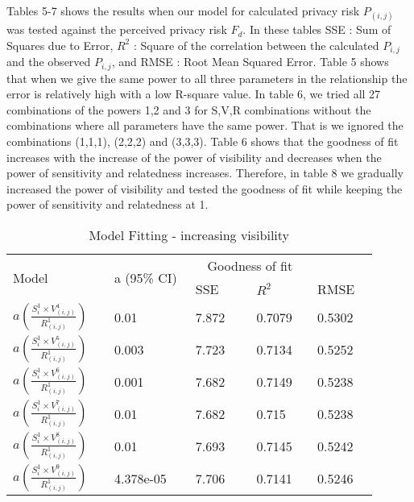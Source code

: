 \documentclass[10pt]{article}
\begin{document}
Tables 5-7 shows the results when our model for calculated privacy risk $P_{(i,j)}$ was tested against the perceived privacy risk $F_d$. In these tables SSE : Sum of Squares due to Error, $R^2$ : Square of the correlation between the calculated $P_{i,j}$ and the observed $P_{i,j}$, and RMSE : Root Mean Squared Error. Table 5 shows that when we give the same power to all three parameters in the relationship the error is relatively high with a low R-square value. In table 6, we tried all 27 combinations of the powers 1,2 and 3 for S,V,R combinations without the combinations where all parameters have the same power. That is we ignored the combinations (1,1,1), (2,2,2) and (3,3,3). Table 6 shows that the goodness of fit increases with the increase of the power of visibility and decreases when the power of sensitivity and relatedness increases. Therefore, in table 8 we gradually increased the power of visibility and tested the goodness of fit while keeping the power of sensitivity and relatedness at 1. 
\begin{center}
\begin{table}[htbp]
\caption{Model Fitting - increasing visibility}
\begin{center}
\begin{adjustbox}{width=0.5\textwidth} 
\begin{tabular}{|p{0.25\linewidth}|p{0.2\linewidth}|p{0.15\linewidth}|p{0.15\linewidth}|p{0.15\linewidth}|} 
\hline
\multirow{2}{*}{Model}&\multirow{2}{*}{a (95\% CI)}& \multicolumn{2}{c}{Goodness of fit} &\\   \cline{3-5}
& & SSE& $R^2$& RMSE\\
\hline
 $a(  \frac{S_{i}^1 \times V_{(i,j)}^4}{R_{(i,j)}^1})$ & 0.01 & 7.872 & 0.7079 & 0.5302\\
\hline
 $a(  \frac{S_{i}^1 \times V_{(i,j)}^5}{R_{(i,j)}^1}) $ & 0.003 & 7.723 & 0.7134 & 0.5252 \\
\hline
$a(  \frac{S_{i}^1 \times V_{(i,j)}^6}{R_{(i,j)}^1})$ & 0.001 & 7.682 & 0.7149 & 0.5238 \\
\hline
$a(  \frac{S_{i}^1 \times V_{(i,j)}^7}{R_{(i,j)}^1})$ & 0.01 & 7.682 & 0.715 & 0.5238 \\
\hline
$a(  \frac{S_{i}^1 \times V_{(i,j)}^8}{R_{(i,j)}^1})$ & 0.01 & 7.693 & 0.7145 & 0.5242 \\
\hline
$a(  \frac{S_{i}^1 \times V_{(i,j)}^9}{R_{(i,j)}^1})$ & 4.378e-05 & 7.706 & 0.7141 & 0.5246 \\
\hline
\end{tabular}
\end{adjustbox}
\end{center}
\end{table}
\end{center}
\end{document}
